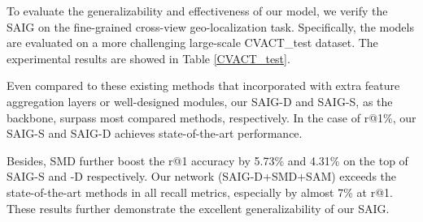 \documentclass[sn-basic,iicol]{sn-jnl}
\theoremstyle{thmstyletwo}\newtheorem{example}{Example}\newtheorem{remark}{Remark}
\theoremstyle{thmstylethree}\newtheorem{definition}{Definition}
\begin{document}
 To evaluate the generalizability and effectiveness of our model, we verify the SAIG on the fine-grained cross-view geo-localization task. Specifically, the models are evaluated on a more challenging large-scale CVACT\_test dataset. The experimental results are showed in Table \ref{CVACT_test}. 

Even compared to these existing methods that incorporated with extra feature aggregation layers or well-designed modules, our SAIG-D and SAIG-S, as the backbone, surpass most compared methods, respectively. In the case of r@1\%, our SAIG-S and SAIG-D achieves state-of-the-art performance. 





Besides, SMD further boost the r@1 accuracy by 5.73\% and 4.31\% on the top of SAIG-S and -D respectively. 
Our network (SAIG-D+SMD+SAM) exceeds the state-of-the-art methods in all recall metrics, especially by almost 7\% at r@1.
These results further demonstrate the excellent generalizability of our SAIG.
\end{document}
